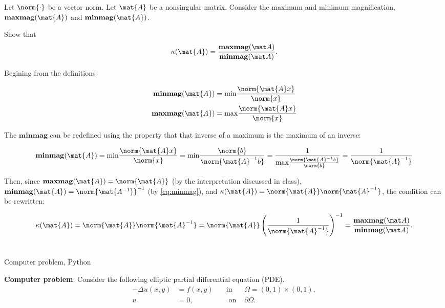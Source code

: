 \documentclass{template}
\newcommand{\maxmag}{\mathrm{\mathbf{maxmag}}}
\newcommand{\minmag}{\mathrm{\mathbf{minmag}}}
\begin{document}
\section{}
Let $\norm{\cdot}$ be a vector norm. 
Let $\mat{A}$ be a nonsingular matrix.
Consider the maximum and minimum magnification, 
$\maxmag(\mat{A})$ and $\minmag(\mat{A})$.
 
Show that 
\[
   \kappa(\mat{A}) = \frac{\maxmag(\mat A)}{\minmag(\mat A)}.
\]

Begining from the definitions

\begin{equation}
    \begin{split}
        \minmag(\mat{A}) & = \text{min}\frac{\norm{\mat{A}x}}{\norm{x}}\\
        \maxmag(\mat{A}) & = \text{max}\frac{\norm{\mat{A}x}}{\norm{x}}
    \end{split}
\end{equation}

The $\minmag$ can be redefined using the property that that inverse of a maximum is the maximum of an inverse:

\begin{equation}\label{eq:minmag}
    \minmag(\mat{A}) = \text{min}\frac{\norm{\mat{A}x}}{\norm{x}} = \text{min}\frac{\norm{b}}{\norm{\mat{A}^{-1}b}} = \frac{1}{\text{max}\frac{\norm{\mat{A}^{-1}b}}{\norm{b}}} = \frac{1}{\norm{\mat{A}^{-1}}}
\end{equation}

Then, since $\maxmag(\mat{A}) = \norm{\mat{A}}$ (by the interpretation discussed in class), $\minmag(\mat{A}) = \norm{\mat{A^{-1}}}^{-1}$ (by \autoref{eq:minmag}), and $\kappa (\mat{A}) = \norm{\mat{A}}\norm{\mat{A}^{-1}}$, the condition can be rewritten:

\begin{equation}
    \kappa (\mat{A}) = \norm{\mat{A}}\norm{\mat{A}^{-1}} = \norm{\mat{A}} \left( \frac{1}{\norm{\mat{A}^{-1}}}\right)^{-1} = \frac{\maxmag(\mat A)}{\minmag(\mat A)}.
\end{equation}


\section{} Computer problem, Python

\textbf{Computer problem}. Consider the following elliptic partial differential equation (PDE). 
\begin{equation}\label{equ:poisson}
\begin{alignedat}{2}
-\Delta u(x, y) &= f(x, y) \quad &\text{in } &\Omega = (0, 1) \times (0, 1),\\
        u       &= 0,      \quad &\text{ on } &\partial \Omega.
\end{alignedat}
\end{equation}
\end{document}
